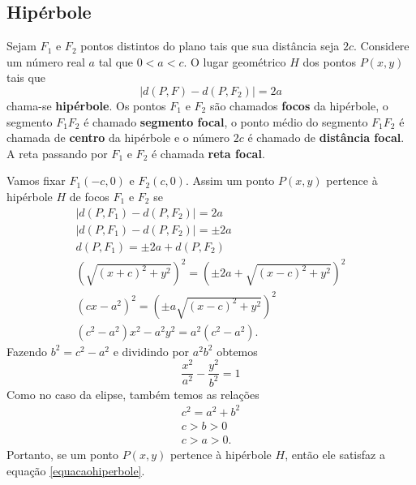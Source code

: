 \subsection{Hip\'erbole} %
\label{sub:hiperbole}

\begin{definicao}
  Sejam $F_1$ e $F_2$ pontos distintos do plano tais que sua dist\^ancia seja $2c$. Considere um n\'umero real $a$ tal que $0 < a < c$. O lugar geom\'etrico $H$ dos pontos $P(x,y)$ tais que 
  \begin{equation}\label{equacaohiperbole}
    \mid d(P,F) - d(P,F_2)\mid = 2a
  \end{equation}
  chama-se \textbf{hip\'erbole}. Os pontos $F_1$ e $F_2$ s\~ao chamados \textbf{focos} da hip\'erbole, o segmento $F_1F_2$ \'e chamado \textbf{segmento focal}, o ponto m\'edio do segmento $F_1F_2$ \'e chamada de \textbf{centro} da hip\'erbole e o n\'umero $2c$ \'e chamado de \textbf{dist\^ancia focal}. A reta passando por $F_1$ e $F_2$ \'e chamada \textbf{reta focal}.     
\end{definicao}

Vamos fixar $F_1(-c,0)$ e $F_2(c,0)$. Assim um ponto $P(x,y)$ pertence \`a hip\'erbole $H$ de focos $F_1$ e $F_2$ se
\begin{align*}
  | d(P,F_1) - d(P,F_2) | = 2a\\
  | d(P,F_1) - d(P,F_2) | = \pm 2a\\
  d(P,F_1) = \pm 2a + d(P,F_2)\\
  (\sqrt{(x + c)^2 + y^2})^2 = (\pm 2a + \sqrt{(x - c)^2 + y^2})^2\\
  (cx - a^2)^2 = (\pm a\sqrt{(x - c)^2 + y^2})^2\\
  (c^2 - a^2)x^2 - a^2y^2 = a^2(c^2 - a^2).
\end{align*}
Fazendo $b^2 = c^2 - a^2$ e dividindo por $a^2b^2$ obtemos
\begin{equation}
  \dfrac{x^2}{a^2} - \dfrac{y^2}{b^2} = 1
\end{equation}
Como no caso da elipse, tamb\'em temos as rela\c{c}\~oes
\begin{align}
  c^2 = a^2 + b^2\\
  c > b > 0\label{pitagorashiperbole}\\
  c > a > 0.
\end{align}
Portanto, se um ponto $P(x,y)$ pertence \`a hip\'erbole $H$, ent\~ao ele satisfaz a equa\c{c}\~ao \eqref{equacaohiperbole}.

